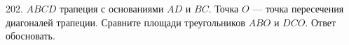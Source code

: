 202. $ABCD$ трапеция с основаниями $AD$ и $BC.$ Точка $O$ --- точка пересечения диагоналей трапеции. Сравните площади треугольников $ABO$ и $DCO.$ Ответ обосновать.\\
